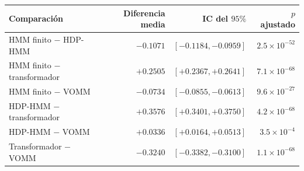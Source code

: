 \begin{tabular}{lrrr}
\hline
Comparación & Diferencia media & IC del $95\%$ & $p$ ajustado \\
\hline
HMM finito $-$ HDP-HMM & $-0.1071$ & $[-0.1184, -0.0959]$ & $2.5\times 10^{-52}$ \\
HMM finito $-$ transformador & $+0.2505$ & $[+0.2367, +0.2641]$ & $7.1\times 10^{-68}$ \\
HMM finito $-$ VOMM & $-0.0734$ & $[-0.0855, -0.0613]$ & $9.6\times 10^{-27}$ \\
HDP-HMM $-$ transformador & $+0.3576$ & $[+0.3401, +0.3750]$ & $4.2\times 10^{-68}$ \\
HDP-HMM $-$ VOMM & $+0.0336$ & $[+0.0164, +0.0513]$ & $3.5\times 10^{-4}$ \\
Transformador $-$ VOMM & $-0.3240$ & $[-0.3382, -0.3100]$ & $1.1\times 10^{-68}$ \\
\hline
\end{tabular}
